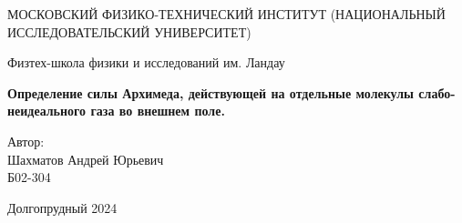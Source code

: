 \documentclass[12pt]{article}
\begin{document}
\begin{titlepage}
    \begin{center}
        {\large МОСКОВСКИЙ ФИЗИКО-ТЕХНИЧЕСКИЙ ИНСТИТУТ (НАЦИОНАЛЬНЫЙ ИССЛЕДОВАТЕЛЬСКИЙ УНИВЕРСИТЕТ)}
    \end{center}
    \begin{center}
        {\large Физтех-школа физики и исследований им. Ландау}
    \end{center}
    
    
    \vspace{3cm}
    {\huge
        \begin{center}
            \textbf{Определение силы Архимеда, действующей на отдельные молекулы слабо-неидеального газа во внешнем поле.}
        \end{center}
    }
    \vspace{2cm}
    \begin{flushright}
        {\LARGE Автор:\\ Шахматов Андрей Юрьевич \\
            \vspace{0.2cm}
            Б02-304}
    \end{flushright}
    \vspace{7 cm}
    \begin{center}
        Долгопрудный 2024
    \end{center}
\end{titlepage}


\begin{abstract}
    Рассмотрен вопрос действия силы Архимеда на отдельные молекулы 
    вещества. Предложена причина возникновения силы Архимеда для одиночных молекул. 
    Рассчитана сила Архимеда для слабо-неидеальных веществ, при этом рассмотрены 
    случаи атомарного вещества и плазмы. Определено, что характерным параметром, 
    определяющим силу Архимеда для атомарного вещества является 
    второй вириальный коэффициент.
\end{abstract}

\tableofcontents
\end{document}
